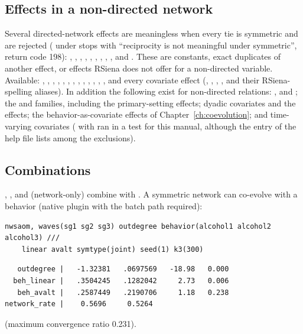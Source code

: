 \subsection{Effects in a non-directed network}

Several directed-network effects are meaningless when every tie is symmetric and are rejected ( under  stops with ``reciprocity is not meaningful under symmetric'', return code 198): , , , , , , , , ,  and . These are constants, exact duplicates of another effect, or effects RSiena does not offer for a non-directed variable. Available: , , , , , , , , , , , , , and every covariate effect (, , , ,  and their RSiena-spelling aliases). In addition the following exist for non-directed relations: ,  and ; the  and  families, including the primary-setting effects; dyadic covariates and the  effects; the behavior-as-covariate effects of Chapter~\ref{ch:coevolution}; and time-varying covariates ( with  ran in a test for this manual, although the  entry of the help file lists  among the exclusions).

\subsection{Combinations}

, ,  and  (network-only) combine with . A symmetric network can co-evolve with a behavior (native plugin with the batch path required):
\begin{lstlisting}
nwsaom, waves(sg1 sg2 sg3) outdegree behavior(alcohol1 alcohol2 alcohol3) ///
    linear avalt symtype(joint) seed(1) k3(300)
\end{lstlisting}
\begin{lstlisting}
   outdegree |   -1.32381   .0697569   -18.98   0.000
  beh_linear |   .3504245   .1282042     2.73   0.006
   beh_avalt |   .2587449   .2190706     1.18   0.238
network_rate |    0.5696     0.5264
\end{lstlisting}
(maximum convergence ratio 0.231).

